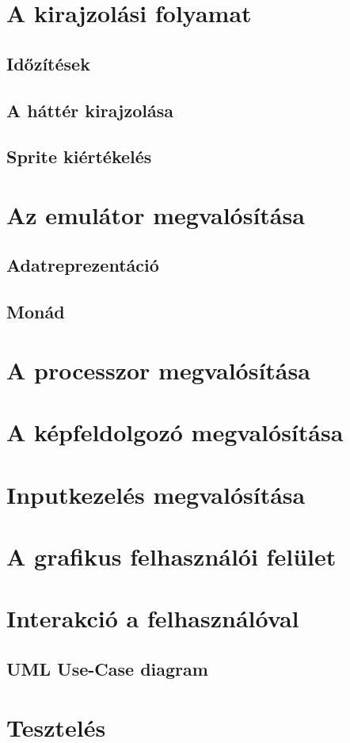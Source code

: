 \section{A kirajzolási folyamat}

\subsection{Időzítések}

\subsection{A háttér kirajzolása}

\subsection{Sprite kiértékelés}

\section{Az emulátor megvalósítása}

\subsection{Adatreprezentáció}

\subsection{Monád}

\section{A processzor megvalósítása}

\section{A képfeldolgozó megvalósítása}

\section{Inputkezelés megvalósítása}

\section{A grafikus felhasználói felület}

\section{Interakció a felhasználóval}

\subsection{UML Use-Case diagram}

\section{Tesztelés}




